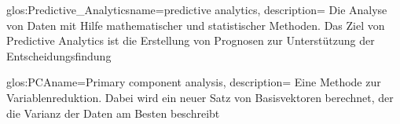 


\newglossaryentry
{glos:Predictive_Analytics}{name=predictive analytics, description=
{Die Analyse von Daten mit Hilfe mathematischer und statistischer Methoden.
Das Ziel von Predictive Analytics ist die Erstellung von Prognosen zur
Unterstützung der Entscheidungsfindung}
}

\newglossaryentry
{glos:PCA}{name=Primary component analysis, description=
{Eine Methode zur Variablenreduktion. Dabei wird ein neuer Satz von
Basisvektoren berechnet, der die Varianz der Daten am Besten beschreibt}
}
